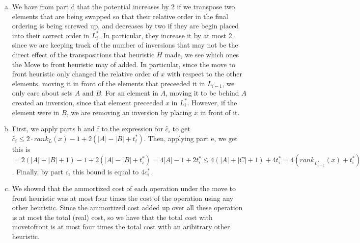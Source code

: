 \documentclass{article}
\begin{document}
\begin{enumerate}[a.]
\item
We have from part d that the potential increases by 2 if we transpose two elements that are being swapped so that their relative order in the final ordering is being screwed up, and decreases by two if they are begin placed into their correct order in $L_i^*$. In particular, they increase it by at most 2. since we are keeping track of the number of inversions that may not be the direct effect of the transpositions that heuristic $H$ made, we see which ones the Move to front heuristic may of added. In particular, since the move to front heuristic only changed the relative order of $x$ with respect to the other elements, moving it in front of the elements that preceeded it in $L_{i-1}$, we only care about sets $A$ and $B$. For an element in $A$, moving it to be behind $A$ created an inversion, since that element preceeded $x$ in $L_i^*$. However, if the element were in $B$, we are removing an inversion by placing $x$ in front of it.

\item
First, we apply parts b and f to the expression for $\hat{c}_i$ to get $\hat{c}_i \le 2\cdot rank_{L}(x) -1 + 2(|A|-|B|+t_i^*)$. Then, applying part e, we get this is $= 2(|A|+|B|+1) - 1+ 2(|A|-|B|+t_i^*) = 4|A| -1+2t_i^*\le 4(|A|+|C|+1) +4t_i^* = 4(rank_{L_{i-1}^*}(x) + t_i^*)$. Finally, by part c, this bound is equal to $4c_i^*$.
\item
We showed that the ammortized cost of each operation under the move to front heuristic was at most four times the cost of the operation using any other heuristic. Since the ammortized cost added up over all these operation is at most the total (real) cost, so we have that the total cost with movetofront is at most four times the total cost with an aribitrary other heuristic.

\end{enumerate}
\end{document}
